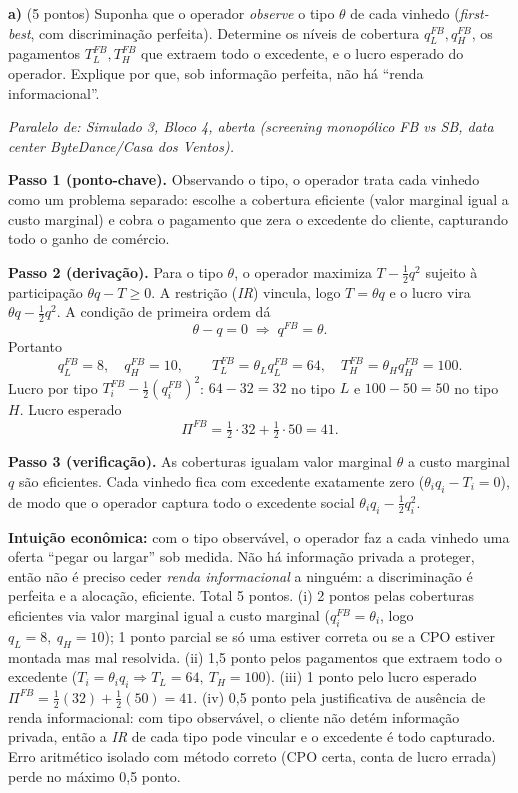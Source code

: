 \textbf{a)} (5 pontos) Suponha que o operador \emph{observe} o tipo $\theta$ de cada vinhedo (\emph{first-best}, com discrimina\c{c}\~ao perfeita). Determine os n\'iveis de cobertura $q_L^{FB}, q_H^{FB}$, os pagamentos $T_L^{FB}, T_H^{FB}$ que extraem todo o excedente, e o lucro esperado do operador. Explique por que, sob informa\c{c}\~ao perfeita, n\~ao h\'a ``renda informacional''.
\resolucaobox{7.2cm}
\begin{solucao}
{\footnotesize\textit{Paralelo de: Simulado 3, Bloco 4, aberta (screening monopólico FB vs SB, data center ByteDance/Casa dos Ventos).}}\par\vspace{0.2em}
\textbf{Passo 1 (ponto-chave).} Observando o tipo, o operador trata cada vinhedo como um problema separado: escolhe a cobertura eficiente (valor marginal igual a custo marginal) e cobra o pagamento que zera o excedente do cliente, capturando todo o ganho de com\'ercio.

\textbf{Passo 2 (deriva\c{c}\~ao).} Para o tipo $\theta$, o operador maximiza $T - \tfrac{1}{2}q^{2}$ sujeito \`a participa\c{c}\~ao $\theta q - T \ge 0$. A restri\c{c}\~ao (\emph{IR}) vincula, logo $T = \theta q$ e o lucro vira $\theta q - \tfrac{1}{2}q^{2}$. A condi\c{c}\~ao de primeira ordem d\'a
\[
\theta - q = 0 \;\Longrightarrow\; q^{FB} = \theta.
\]
Portanto
\[
q_L^{FB} = 8,\quad q_H^{FB} = 10,\qquad T_L^{FB} = \theta_L q_L^{FB} = 64,\quad T_H^{FB} = \theta_H q_H^{FB} = 100.
\]
Lucro por tipo $T_i^{FB} - \tfrac{1}{2}(q_i^{FB})^{2}$: $64 - 32 = 32$ no tipo $L$ e $100 - 50 = 50$ no tipo $H$. Lucro esperado
\[
\Pi^{FB} = \tfrac{1}{2}\cdot 32 + \tfrac{1}{2}\cdot 50 = 41.
\]

\textbf{Passo 3 (verifica\c{c}\~ao).} As coberturas igualam valor marginal $\theta$ a custo marginal $q$ \textemdash{} s\~ao eficientes. Cada vinhedo fica com excedente exatamente zero ($\theta_i q_i - T_i = 0$), de modo que o operador captura todo o excedente social $\theta_i q_i - \tfrac{1}{2}q_i^{2}$.

\textbf{Intui\c{c}\~ao econ\^omica:} com o tipo observ\'avel, o operador faz a cada vinhedo uma oferta ``pegar ou largar'' sob medida. N\~ao h\'a informa\c{c}\~ao privada a proteger, ent\~ao n\~ao \'e preciso ceder \emph{renda informacional} a ningu\'em: a discrimina\c{c}\~ao \'e perfeita e a aloca\c{c}\~ao, eficiente.
\rubricalabel
Total 5 pontos. (i) 2 pontos pelas coberturas eficientes via valor marginal igual a custo marginal ($q_i^{FB} = \theta_i$, logo $q_L = 8,\ q_H = 10$); 1 ponto parcial se s\'o uma estiver correta ou se a CPO estiver montada mas mal resolvida. (ii) 1{,}5 ponto pelos pagamentos que extraem todo o excedente ($T_i = \theta_i q_i \Rightarrow T_L = 64,\ T_H = 100$). (iii) 1 ponto pelo lucro esperado $\Pi^{FB} = \tfrac{1}{2}(32) + \tfrac{1}{2}(50) = 41$. (iv) 0{,}5 ponto pela justificativa de aus\^encia de renda informacional: com tipo observ\'avel, o cliente n\~ao det\'em informa\c{c}\~ao privada, ent\~ao a \emph{IR} de cada tipo pode vincular e o excedente \'e todo capturado. Erro aritm\'etico isolado com m\'etodo correto (CPO certa, conta de lucro errada) perde no m\'aximo 0{,}5 ponto.
\end{solucao}

